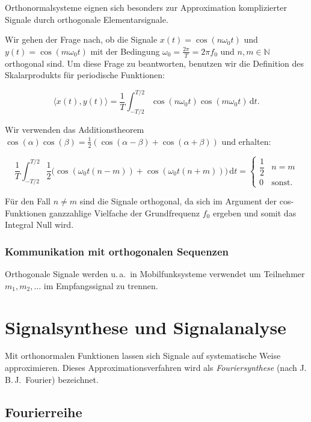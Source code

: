 Orthonormalsysteme eignen sich besonders zur Approximation komplizierter Signale durch orthogonale Elementarsignale.

\begin{beispiel}
Wir gehen der Frage nach, ob die Signale $x(t) = \cos(n\omega_0 t)$ und $y(t) = \cos(m\omega_0 t)$ mit der Bedingung $\omega_0 = \frac{2\pi}{T} = 2\pi f_0$ und $n, m \in \mathbb{N}$ orthogonal sind. Um diese Frage zu beantworten, benutzen wir die Definition des Skalarprodukts für periodische Funktionen:

$$
\langle x(t), y(t)\rangle = \frac{1}{T}\int_{-T/2}^{T/2} \cos(n\omega_0 t)\cos(m\omega_0 t)\,\mathrm{d}t.
$$

Wir verwenden das Additionstheorem $\cos(\alpha)\cos(\beta) = \frac{1}{2}(\cos(\alpha-\beta) + \cos(\alpha+\beta))$ und erhalten:

$$
\frac{1}{T}\int_{-T/2}^{T/2} \frac{1}{2}\bigl(\cos(\omega_0 t(n-m)) + \cos(\omega_0 t(n+m))\bigr)\,\mathrm{d}t = \begin{cases} \dfrac{1}{2} & n = m \\ 0 & \text{sonst.} \end{cases}
$$

Für den Fall $n \neq m$ sind die Signale orthogonal, da sich im Argument der cos-Funktionen ganzzahlige Vielfache der Grundfrequenz $f_0$ ergeben und somit das Integral Null wird.
\end{beispiel}

\subsection*{Kommunikation mit orthogonalen Sequenzen}

Orthogonale Signale werden u.\,a.\ in Mobilfunksysteme verwendet um Teilnehmer $m_1, m_2, \ldots$ im Empfangssignal zu trennen.

\chapter{Signalsynthese und Signalanalyse}
\label{chap:signalsynthese}

Mit orthonormalen Funktionen lassen sich Signale auf systematische Weise approximieren. Dieses Approximationsverfahren wird als \textit{Fouriersynthese} (nach J.\,B.\,J.\ Fourier) bezeichnet.

\section{Fourierreihe}
\label{sec:fourierreihe}

